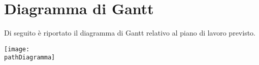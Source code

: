 \newpage
\section*{Diagramma di Gantt}
Di seguito è riportato il diagramma di Gantt relativo al piano di lavoro previsto.
\begin{center}
	\texttt{[image: \\pathDiagramma]}
\end{center}